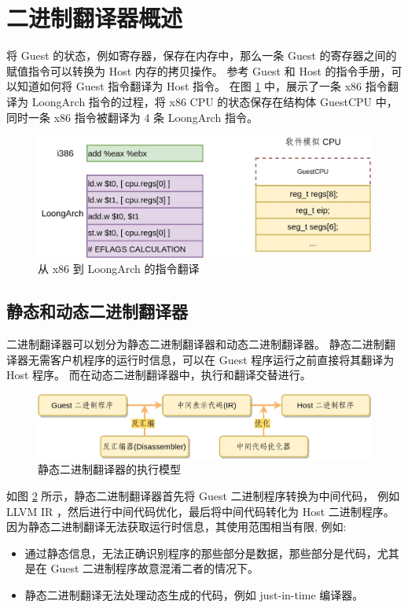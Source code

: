 \section{二进制翻译器概述}

将 Guest 的状态，例如寄存器，保存在内存中，那么一条 Guest 的寄存器之间的赋值指令可以转换为 Host 内存的拷贝操作。
参考 Guest 和 Host 的指令手册，可以知道如何将 Guest 指令翻译为 Host 指令。
在图 \ref{fig:basic_flow} 中，展示了一条 x86 指令翻译为 LoongArch 指令的过程，将 x86 CPU 的状态保存在结构体 GuestCPU 中，
同时一条 x86 指令被翻译为 4 条 LoongArch 指令。

\begin{figure}[!htbp]
	\centering
	\includegraphics[width=1.0\textwidth]{./images/basic-flow.jpg}
	\caption{从 x86 到 LoongArch 的指令翻译}
	\label{fig:basic_flow}
\end{figure}

\subsection{静态和动态二进制翻译器}
二进制翻译器可以划分为静态二进制翻译器和动态二进制翻译器。
静态二进制翻译器无需客户机程序的运行时信息，可以在 Guest 程序运行之前直接将其翻译为 Host 程序。
而在动态二进制翻译器中，执行和翻译交替进行。

\begin{figure}[!htbp]
	\centering
	\includegraphics[width=1.0\textwidth]{./images/static-bt.jpg}
	\caption{静态二进制翻译器的执行模型}
	\label{fig:static_bt}
\end{figure}

如图 \ref{fig:static_bt} 所示，静态二进制翻译器首先将 Guest 二进制程序转换为中间代码，
例如 LLVM IR \citep{shen2012llbt}，然后进行中间代码优化，最后将中间代码转化为 Host 二进制程序。
因为静态二进制翻译无法获取运行时信息，其使用范围相当有限, 例如:
\begin{itemize}
	\item 通过静态信息，无法正确识别程序的那些部分是数据，那些部分是代码，尤其是在 Guest 二进制程序故意混淆二者的情况下。
	\item 静态二进制翻译无法处理动态生成的代码，例如 just-in-time 编译器。
\end{itemize}

